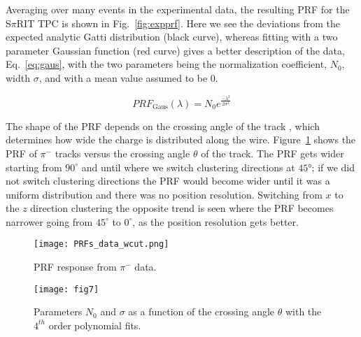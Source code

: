 Averaging over many events in the experimental data, the resulting PRF for the S$\pi$RIT TPC is shown in Fig.~\ref{fig:expprf}. Here we see the deviations from the expected analytic Gatti distribution (black curve), whereas fitting with a two parameter Gaussian function (red curve) gives a better description of the  data, Eq.~\ref{eq:gaus}, with the two parameters being the normalization coefficient, $N_0$, width $\sigma$, and with a mean value assumed to be 0.

\begin{equation}\label{eq:gaus}
PRF_{\mathrm{Gaus}}(\lambda) = N_0 e^\frac{-\lambda^2}{2\sigma^2}
\end{equation}

\begin{comment}
\begin{figure}[ht!]s
\begin{overpic}[width=\linewidth]{fig5.pdf}
\put(61,55){\contour{white}{ PRF${}_{\mathrm{Gaus}}(\lambda)$ eq. \ref{eq:gaus}  }}
\put(61,49){\contour{white}{ PRF${}_{\mathrm{Gatti}}(\lambda)$ eq. \ref{eq:gatti} }}
\end{overpic}
\caption{Experimental pad response function of many events for a crossing angle of $85^{\circ} < \theta \leq 90^{\circ}$.  }
\label{fig:expprf}
\end{figure}
\end{comment}


The shape of the PRF depends on the crossing angle of the track \cite{gatti}, which determines how wide the charge is distributed along the wire. Figure~\ref{fig:prfpimData} shows the PRF of $\pi^-$ tracks versus the crossing angle $\theta$ of the track. The PRF gets wider starting from $90^{\circ}$  and until where we switch clustering directions at $\ang{45}$; if we did not switch clustering directions the PRF would become wider until it was a uniform distribution and there was no position resolution. Switching from $x$ to the $z$ direction clustering the opposite trend is seen where the PRF becomes narrower  going from $45^{\circ}$ to $0^{\circ}$, as the position resolution gets better.




\begin{figure}[!htb]
     \centering
	 \texttt{[image: PRFs\_data\_wcut.png]}
     \caption{PRF response from $\pi^-$ data. }
     \label{fig:prfpimData}
\end{figure}

\begin{figure}[ht!]
\vspace{5mm}
\texttt{[image: fig7]}
\caption{Parameters $N_{0}$ and $\sigma$ as a function of the crossing angle $\theta$ with the $4^{th}$ order polynomial fits.}
\label{fig:normsigma}
\end{figure}

